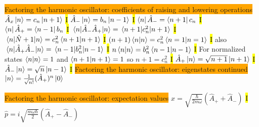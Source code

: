 \documentclass[fontsize=4pt]{scrartcl}
\begin{document}
\colorbox{Orange}{Factoring the harmonic oscillator: coefficients of raising and lowering operations}
$\hat{A}_x \ket{n} = c_n \ket{n+1}$
\hl{I}
$\hat{A}_- \ket{n} = b_n \ket{n-1}$
\hl{I}
$\bra{n} \hat{A}_- = \bra{n+1} c_n$
\hl{I}
$\bra{n} \hat{A}_+ = \bra{n-1} b_n$
\hl{I}
$\expval{\hat{A}_- \hat{A}_+}{n} = \expval{c_n^2}{n+1}$
\hl{I}
$\expval{\hat{N} + 1}{n} = c_n^2\braket{n+1}$
\hl{I}
$(n+1)\braket{n} = c_n^2\braket{n=1}$
\hl{I} also
$\expval{\hat{A}_+ \hat{A}_-}{n} = \expval{b_n^2}{n-1}$
\hl{I}
$n\braket{n} = b_n^2 \braket{n-1}$
\hl{I}
For normalized states $\braket{n} = 1$ and $\braket{n+1} = 1$ so $n+1 = c_n^2$
\hl{I}
$\hat{A}_+ \ket{n} = \sqrt{n+1} \ket{n+1}$
\hl{I}
$\hat{A}_- \ket{n} = \sqrt{n}\ket{n-1}$
\hl{I}
\colorbox{Orange}{Factoring the harmonic oscillator: eigenstates continued}
$\ket{n} = \frac{1}{\sqrt{n!}}(\hat{A}_+)^n \ket{0}$

\colorbox{Orange}{Factoring the harmonic oscillator: expectation values}
$x = \sqrt{\frac{\hbar}{2m\omega}}(\hat{A}_+ + \hat{A}_-)$
\hl{I}
$\hat{p} = i\sqrt{\frac{m\omega \hbar}{2}} (\hat{A}_+ - \hat{A}_-)$
\end{document}
